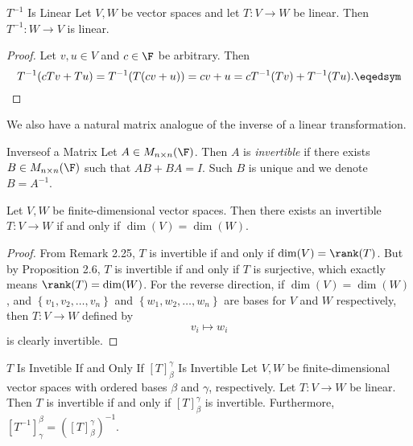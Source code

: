 \documentclass[linearalgebra]{subfiles}
\begin{document}
    \begin{prop}{$T^{-1}$ Is Linear}
        Let $V, W$ be vector spaces and let $T:V\to W$ be linear. Then $T^{-1} : W\to V$ is linear.
    \end{prop}

    \begin{proof}
        Let $v, u\in V$ and $c\in \F$ be arbitrary. Then
        \begin{equation*}
            T^{-1}(cTv + Tu) = T^{-1}(T(cv+u)) = cv+u = cT^{-1}(Tv)+T^{-1}(Tu). \eqedsym
        \end{equation*}
    \end{proof}

    \begin{remark}
        We also have a natural matrix analogue of the inverse of a linear transformation.
    \end{remark}

    \begin{definition}{Inverse}{of a Matrix}
        Let $A\in M_{n\times n}(\F)$. Then $A$ is \emph{invertible} if there exists $B\in M_{n\times n}(\F)$ such that $AB+BA=I$. Such $B$ is unique and we denote $B=A^{-1}$.  
    \end{definition}

    \begin{prop}{}
        Let $V, W$ be finite-dimensional vector spaces. Then there exists an invertible $T:V\to W$ if and only if $\dim(V)=\dim(W)$.
    \end{prop}

    \begin{proof}
        From Remark 2.25, $T$ is invertible if and only if $\dim(V)=\rank(T)$. But by Proposition 2.6, $T$ is invertible if and only if $T$ is surjective, which exactly means $\rank(T)=\dim(W)$. For the reverse direction, if $\dim(V)=\dim(W)$, and $\left\lbrace v_1,v_2,\ldots,v_n \right\rbrace$ and $\left\lbrace w_1,w_2,\ldots,w_n \right\rbrace$ are bases for $V$ and $W$ respectively, then $T:V\to W$ defined by
        \begin{equation*}
            v_i\mapsto w_i
        \end{equation*}
        is clearly invertible.
    \end{proof}

    \begin{prop}{$T$ Is Invetible If and Only If $\left[ T \right] ^\gamma_\beta$ Is Invertible}
        Let $V, W$ be finite-dimensional vector spaces with ordered bases $\beta$ and $\gamma$, respectively. Let $T: V\to W$ be linear. Then $T$ is invertible if and only if $[T]^\gamma_\beta$ is invertible. Furthermore, $[T^{-1}]^\beta_\gamma = \left( [T]^\gamma_\beta \right)^{-1}$.
    \end{prop}
\end{document}
